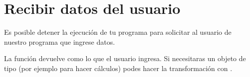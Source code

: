 \documentclass[a5paper,9pt,spanish]{sphinxmanual}
\begin{document}
\sphinxstepscope


\chapter{Recibir datos del usuario }
\label{\detokenize{input:recibir-datos-del-usuario-input}}\label{\detokenize{input::doc}}
\sphinxAtStartPar
Es posible detener la ejecución de tu programa para solicitar
al usuario de nuestro programa que ingrese datos.

\begin{sphinxVerbatim}[commandchars=\\\{\}]
  
  
\end{sphinxVerbatim}

\sphinxAtStartPar
La función  devuelve como  lo que el usuario ingresa.
Si necesitaras un objeto de tipo  (por ejemplo para hacer cálculos)
podes hacer la transformación con .
\end{document}
